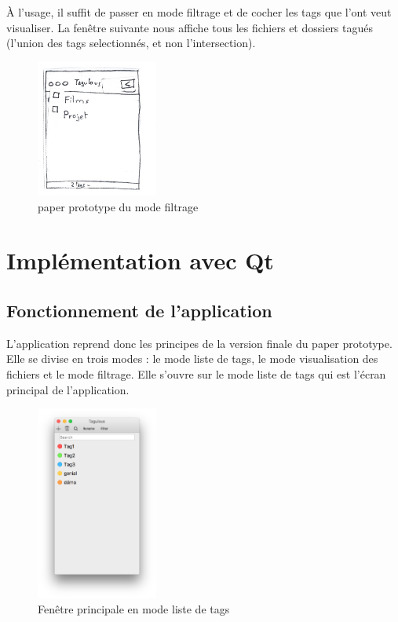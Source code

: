 \documentclass{report}
\begin{document}
            À l'usage, il suffit de passer en mode filtrage et de cocher les tags que l'ont veut visualiser. La fenêtre suivante nous affiche tous les fichiers et dossiers tagués (l'union des tags selectionnés, et non l'intersection).
            
            \begin{figure}[htbp]
            \begin{center}
                \includegraphics[width=4cm]{version3.jpg}
                \caption{paper prototype du mode filtrage}
                \end{center}
            \end{figure}            

\chapter{Implémentation avec Qt}
    \section{Fonctionnement de l'application}
        L'application reprend donc les principes de la version finale du paper prototype. Elle se divise en trois modes : le mode liste de tags, le mode visualisation des fichiers et le mode filtrage. Elle s'ouvre sur le mode liste de tags qui est l'écran principal de l'application.
        \begin{figure}[htbp]
            \begin{center}
            \includegraphics[width=4cm]{listetags.png}
            \caption{Fenêtre principale en mode liste de tags}
            \end{center}
        \end{figure}
    
\end{document}
